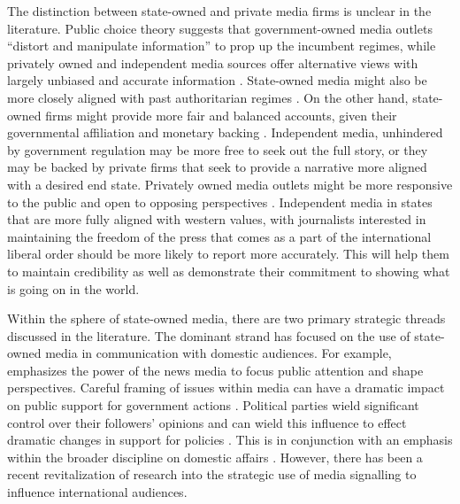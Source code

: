 \documentclass[12pt]{article}
\begin{document}
The distinction between state-owned and private media firms is unclear in the literature. Public choice theory suggests that government-owned media outlets “distort and manipulate information” to prop up the incumbent regimes, while privately owned and independent media sources offer alternative views with largely unbiased and accurate information \citep{djankov_who_2003}. State-owned media might also be more closely aligned with past authoritarian regimes \citep{moehler_whose_2011}. On the other hand, state-owned firms might provide more fair and balanced accounts, given their governmental affiliation and monetary backing \citep{djankov_who_2003}. Independent media, unhindered by government regulation may be more free to seek out the full story, or they may be backed by private firms that seek to provide a narrative more aligned with a desired end state. Privately owned media outlets might be more responsive to the public and open to opposing perspectives \citep{moehler_whose_2011}. Independent media in states that are more fully aligned with western values, with journalists interested in maintaining the freedom of the press that comes as a part of the international liberal order should be more likely to report more accurately. This will help them to maintain credibility as well as demonstrate their commitment to showing what is going on in the world. 

Within the sphere of state-owned media, there are two primary strategic threads discussed in the literature. The dominant strand has focused on the use of state-owned media in communication with domestic audiences. For example, \citet{mccombs_agenda-setting_2002} emphasizes the power of the news media to focus public attention and shape perspectives. Careful framing of issues within media can have a dramatic impact on public support for government actions \citep{gershkoff_shaping_2005}. Political parties wield significant control over their followers' opinions and can wield this influence to effect dramatic changes in support for policies \citep{slothuus_how_2021}. This is in conjunction with an emphasis within the broader discipline on domestic affairs \citep{tomz_public_2020, de_mesquita_testing_2004}. However, there has been a recent revitalization of research into the strategic use of media signalling to influence international audiences. 
\end{document}
